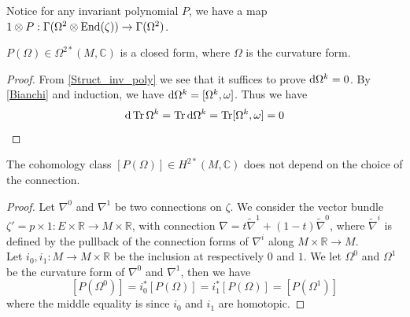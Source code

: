 	Notice for any invariant polynomial $P$, we have a map $1\otimes P:\Gamma(\Omega^2\otimes\operatorname{\mathrm{End}}(\zeta))\to\Gamma(\Omega^2)$. 
	\begin{prop}
		$P(\Omega)\in\Omega^{2*}(M,\mathbb{C})$ is a closed form, where $\Omega$ is the curvature form. 
	\end{prop}
	\begin{proof}
		From \cref{Struct_inv_poly} we see that it suffices to prove $\mathrm{d}\Omega^k=0$. By \cref{Bianchi} and induction, we have $\mathrm{d}\Omega^k=[\Omega^k,\omega]$. Thus we have 
		\[ \mathrm{d}\operatorname{\mathrm{Tr}}\Omega^k=\operatorname{\mathrm{Tr}}\mathrm{d}\Omega^k=\operatorname{\mathrm{Tr}}[\Omega^k,\omega]=0 \]
	\end{proof}
	\begin{prop}
		The cohomology class $[P(\Omega)]\in H^{2*}(M,\mathbb{C})$ does not depend on the choice of the connection. 
	\end{prop}
	\begin{proof}
		Let $\nabla^0$ and $\nabla^1$ be two connections on $\zeta$. We consider the vector bundle $\zeta'=p\times1:E\times\mathbb{R}\to M\times\mathbb{R}$, with connection $\nabla=t\tilde{\nabla}^1+(1-t)
		\tilde{\nabla}^0$, where $\tilde{\nabla}^i$ is defined by the pullback of the connection forms of $\nabla^i$ along $M\times\mathbb{R}\to M$. \\
		Let $i_0,i_1:M\to M\times\mathbb{R}$ be the inclusion at respectively $0$ and $1$. We let $\Omega^0$ and $\Omega^1$ be the curvature form of $\nabla^0$ and $\nabla^1$, then we have 
		\[ [P(\Omega^0)]=i_0^*[P(\Omega)]=i_1^*[P(\Omega)]=[P(\Omega^1)] \]
		where the middle equality is since $i_0$ and $i_1$ are homotopic. 
	\end{proof}

